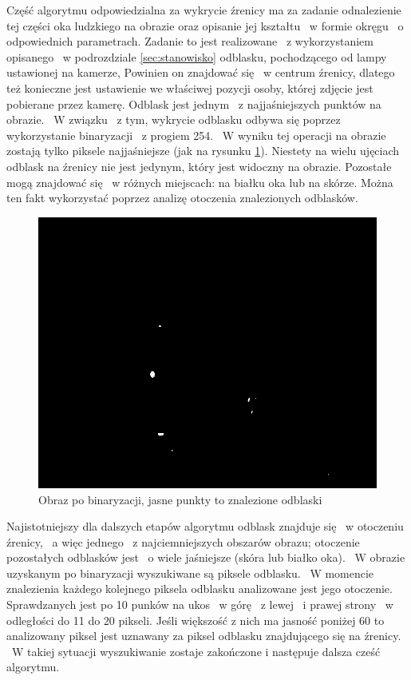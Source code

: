 Część algorytmu odpowiedzialna za wykrycie źrenicy ma za zadanie odnalezienie tej części oka ludzkiego na obrazie oraz opisanie jej kształtu ~w formie okręgu ~o odpowiednich parametrach. Zadanie to jest realizowane ~z wykorzystaniem opisanego ~w podrozdziale \ref{sec:stanowisko} odblasku, pochodzącego od lampy ustawionej na kamerze, Powinien on znajdować się ~w centrum źrenicy, dlatego też konieczne jest ustawienie we właściwej pozycji osoby, której zdjęcie jest pobierane przez kamerę. Odblask jest jednym ~z najjaśniejszych punktów na obrazie. ~W związku ~z tym, wykrycie odblasku odbywa się poprzez wykorzystanie binaryzacji ~z progiem 254. ~W wyniku tej operacji na obrazie zostają tylko piksele najjaśniejsze (jak na rysunku \ref{fig:binaryzacja}). Niestety na wielu ujęciach odblask na źrenicy nie jest jedynym, który jest widoczny na obrazie. Pozostałe mogą znajdować się ~w różnych miejscach: na białku oka lub na skórze. Można ten fakt wykorzystać poprzez analizę otoczenia znalezionych odblasków. 

\begin{figure}
\begin{center}
\includegraphics[scale=0.5]{binaryzacja.jpg}
\caption{Obraz po binaryzacji, jasne punkty to znalezione odblaski}
\label{fig:binaryzacja}
\end{center}
\end{figure}

Najistotniejszy dla dalszych etapów algorytmu odblask znajduje się ~w otoczeniu źrenicy, ~a więc jednego ~z najciemniejszych obszarów obrazu; otoczenie pozostałych odblasków jest ~o wiele jaśniejsze (skóra lub białko oka). ~W obrazie uzyskanym po binaryzacji wyszukiwane są piksele odblasku. ~W momencie znalezienia każdego kolejnego piksela odblasku analizowane jest jego otoczenie. Sprawdzanych jest po 10 punków na ukos ~w górę ~z lewej ~i prawej strony ~w odległości do 11 do 20 pikseli. Jeśli większość z nich ma jasność poniżej 60 to analizowany piksel jest uznawany za piksel odblasku znajdującego się na źrenicy. ~W takiej sytuacji wyszukiwanie zostaje zakończone i następuje dalsza cześć algorytmu.

